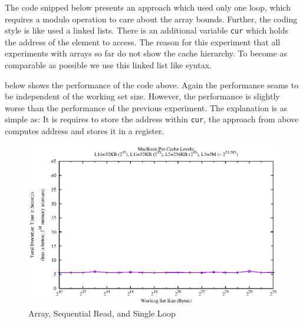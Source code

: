 The code snipped below presents an approach which used only one loop,
which requires a modulo operation to care about the array bounds.
Further, the coding style is like used a linked lists. There is an
additional variable \texttt{cur} which holds the address of the element
to access. The reason for this experiment that all experiments with
arrays so far do not show the cache hierarchy. To become as comparable
as possible we use this linked list like syntax.

\begin{Shaded}
\end{Shaded}

 below shows the performance of the code above. Again the
performance seams to be independent of the working set size. However,
the performance is slightly worse than the performance of the previous
experiment. The explanation is as simple as: It is requires to store the
address within \texttt{cur}, the approach from above computes address
and stores it in a register.

\begin{figure}[htbp]
\centering
\includegraphics{appendix/plots-cache-measurements/plot-array-modulo-seq-2}
\caption{Array, Sequential Read, and Single Loop}
\label{app:array-seqread-sl}
\end{figure}

